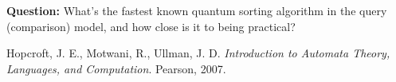 \documentclass{article}
\begin{document}
\textbf{Question:} What’s the fastest known quantum sorting algorithm in the query (comparison) model, and how close is it to being practical?


\begin{thebibliography}{9}
 Hopcroft, J. E., Motwani, R., Ullman, J. D. \textit{Introduction to Automata Theory, Languages, and Computation}. Pearson, 2007.
\end{thebibliography}
\end{document}
